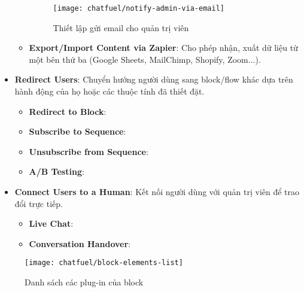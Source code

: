\begin{itemize}
\begin{itemize}
		\begin{figure}[htb!]\centering
			\texttt{[image: chatfuel/notify-admin-via-email]}
			\caption{Thiết lập gửi email cho quản trị viên}
			\label{fig:fig-s3-11-chatfuel-notify-admin-via-email}
		\end{figure}\par
		\item \textbf{Export/Import Content via Zapier}: Cho phép nhận, xuất dữ liệu từ một bên thứ ba (Google Sheets, MailChimp, Shopify, Zoom...).
	\end{itemize}
	\item \textbf{Redirect Users}: Chuyển hướng người dùng sang block/flow khác dựa trên hành động của họ hoặc các thuộc tính đã thiết đặt. \begin{itemize}
		\item \textbf{Redirect to Block}:
		\item \textbf{Subscribe to Sequence}:
		\item \textbf{Unsubscribe from Sequence}:
		\item \textbf{A/B Testing}:
	\end{itemize}
	\item \textbf{Connect Users to a Human}: Kết nối người dùng với quản trị viên để trao đổi trực tiếp. \begin{itemize}
		\item \textbf{Live Chat}:
		\item \textbf{Conversation Handover}:
	\end{itemize}
\end{itemize}
\begin{figure}[htb!]\centering
	\texttt{[image: chatfuel/block-elements-list]}
	\caption{Danh sách các plug-in của block}
	\label{fig:fig-s3-7-chatfuel-block-elements}
\end{figure}
